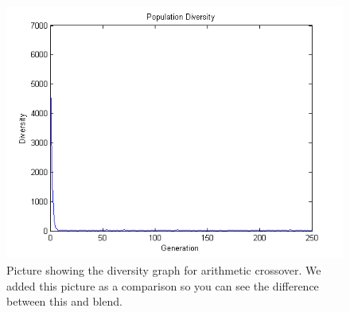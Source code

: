 \documentclass[a4paper]{article}
\begin{document}
 \begin{figure}[H] %
	 \includegraphics[scale=0.8]{arithmeticDiversity.png}
	 \caption{\label{fig:arithmeticDiversity} Picture showing the diversity graph for arithmetic crossover. We added this picture as a comparison so you can see the difference between this and blend. }
 \end{figure}
\end{document}
